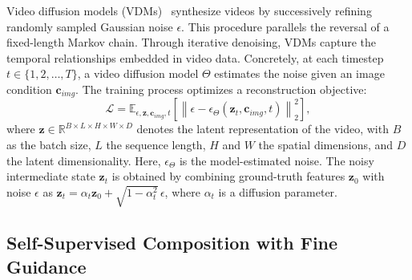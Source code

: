 Video diffusion models (VDMs)~\cite{chen2024videocrafter2,blattmann2023stable,yang2024cogvideox} synthesize videos by successively refining randomly sampled Gaussian noise $\epsilon$. 
This procedure parallels the reversal of a fixed-length Markov chain. 
Through iterative denoising, VDMs capture the temporal relationships embedded in video data. 
Concretely, at each timestep $t \in \{1, 2, \dots, T\}$, a video diffusion model $\Theta$ estimates the noise given an image condition $\boldsymbol{c}_{img}$. 
The training process optimizes a reconstruction objective:
\begin{equation}
\mathcal{L}=\mathbb{E}_{\epsilon, \boldsymbol{z}, \boldsymbol{c}_{img}, t}\left[\left\|\epsilon-\epsilon_{\Theta}\left(\boldsymbol{z}_t, \boldsymbol{c}_{img}, t\right)\right\|_2^2\right],
\label{equ:vdm}
\end{equation}
where $\boldsymbol{z} \in \mathbb{R}^{B \times L \times H \times W \times D}$ denotes the latent representation of the video, with $B$ as the batch size, $L$ the sequence length, $H$ and $W$ the spatial dimensions, and $D$ the latent dimensionality. 
Here, $\epsilon_{\Theta}$ is the model-estimated noise.
The noisy intermediate state $\boldsymbol{z}_{t}$ is obtained by combining ground-truth features $\boldsymbol{z}_{0}$ with noise $\epsilon$ as $\boldsymbol{z}_{t} = \alpha_{t} \boldsymbol{z}_{0} + \sqrt{1 - \alpha_{t}^{2}} \, \epsilon$, where $\alpha_{t}$ is a diffusion parameter.


\subsection{Self-Supervised Composition with Fine Guidance}
\label{sec:composition}


